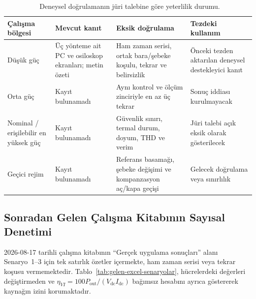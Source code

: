 \begin{table}[htbp]
  \centering
  \caption{\juriistegietiketi\ Deneysel doğrulamanın jüri talebine göre yeterlilik durumu.}
  \label{tab:deney-juri-durum}
  \small
  \begin{tabularx}{\textwidth}{p{} p{} X X}
    \toprule
    Çalışma bölgesi & Mevcut kanıt & Eksik doğrulama & Tezdeki kullanım \\
    \midrule
    Düşük güç & Üç yönteme ait PC ve osiloskop ekranları; metin özeti & Ham zaman serisi, ortak bara/şebeke koşulu, tekrar ve belirsizlik & Önceki tezden aktarılan deneysel destekleyici kanıt \\
    Orta güç & Kayıt bulunamadı & Aynı kontrol ve ölçüm zinciriyle en az üç tekrar & Sonuç iddiası kurulmayacak \\
    Nominal / erişilebilir en yüksek güç & Kayıt bulunamadı & Güvenlik sınırı, termal durum, doyum, THD ve verim & Jüri talebi açık eksik olarak gösterilecek \\
    Geçici rejim & Kayıt bulunamadı & Referans basamağı, şebeke değişimi ve kompanzasyon aç/kapa geçişi & Gelecek doğrulama veya sınırlılık \\
    \bottomrule
  \end{tabularx}
\end{table}



\subsection{Sonradan Gelen Çalışma Kitabının Sayısal Denetimi}

2026-08-17 tarihli çalışma kitabının ``Gerçek uygulama sonuçları'' alanı Senaryo~1--3 için tek satırlık özetler içermekte, ham zaman serisi veya tekrar koşusu vermemektedir. Tablo~\ref{tab:gelen-excel-senaryolar}, hücrelerdeki değerleri değiştirmeden ve $\eta_{VI}=100P_{\mathrm{out}}/(V_{\mathrm{dc}}I_{\mathrm{dc}})$ bağımsız hesabını ayrıca göstererek kaynağın izini korumaktadır.

